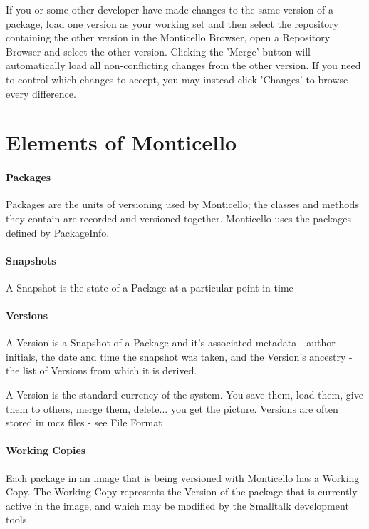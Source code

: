 \documentclass[a4paper,10pt,twoside]{book}
\begin{document}
If you or some other developer have made changes to the same version of a package, load one version as your working set and then select the repository containing the other version in the Monticello Browser, open a Repository Browser and select the other version. Clicking the 'Merge' button will automatically load all non-conflicting changes from the other version. If you need to control which changes to accept, you may instead click 'Changes' to browse every difference.



\section{Elements of Monticello}

\paragraph{Packages}

Packages are the units of versioning used by Monticello; the classes and methods they contain are recorded and versioned together. Monticello uses the packages defined by PackageInfo.

\paragraph{Snapshots}

A Snapshot is the state of a Package at a particular point in time

\paragraph{Versions}

A Version is a Snapshot of a Package and it's associated metadata - author initials, the date and time the snapshot was taken, and the Version's ancestry - the list of Versions from which it is derived.

A Version is the standard currency of the system. You save them, load them, give them to others, merge them, delete... you get the picture. Versions are often stored in mcz files - see File Format

\paragraph{Working Copies}

Each package in an image that is being versioned with Monticello has a Working Copy. The Working Copy represents the Version of the package that is currently active in the image, and which may be modified by the Smalltalk development tools.
\end{document}
